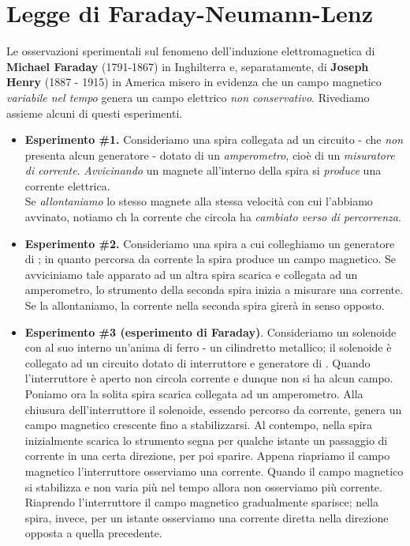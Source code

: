 \section{Legge di Faraday-Neumann-Lenz}
Le osservazioni sperimentali sul fenomeno dell'induzione elettromagnetica di \textbf{Michael Faraday} (1791-1867) in Inghilterra e, separatamente, di \textbf{Joseph Henry} (1887 - 1915) in America misero in evidenza che un campo magnetico \textit{variabile nel tempo} genera un campo elettrico \textit{non conservativo}. Rivediamo assieme alcuni di questi esperimenti.
\begin{itemize}
	\item \textbf{Esperimento \#1.} Consideriamo una spira collegata ad un circuito - che \textit{non} presenta alcun generatore - dotato di un \textit{amperometro}, cioè di un \textit{misuratore di corrente}. \textit{Avvicinando} un magnete all'interno della spira si \textit{produce} una corrente elettrica.\\
	Se \textit{allontaniamo} lo stesso magnete alla stessa velocità con cui l'abbiamo avvinato, notiamo ch la corrente che circola ha \textit{cambiato verso di percorrenza}.
	\item \textbf{Esperimento \#2.} Consideriamo una spira a cui colleghiamo un generatore di \fem; in quanto percorsa da corrente la spira produce un campo magnetico. Se avviciniamo tale apparato ad un altra spira scarica e collegata ad un amperometro, lo strumento della seconda spira inizia a misurare una corrente. Se la allontaniamo, la corrente nella seconda spira girerà in senso opposto.
	\item \textbf{Esperimento \#3 (esperimento di Faraday)}. Consideriamo un solenoide con al suo interno un'anima di ferro - un cilindretto metallico; il solenoide è collegato ad un circuito dotato di interruttore e generatore di \fem. Quando l'interruttore è aperto non circola corrente e dunque non si ha alcun campo.\\
	Poniamo ora la solita spira scarica collegata ad un amperometro. Alla chiusura dell'interruttore il solenoide, essendo percorso da corrente, genera un campo magnetico crescente fino a stabilizzarsi. Al contempo, nella spira inizialmente scarica lo strumento segna per qualche istante un passaggio di corrente in una certa direzione, per poi sparire. Appena riapriamo il campo magnetico l'interruttore osserviamo una corrente. Quando il campo magnetico si stabilizza e non varia più nel tempo allora non osserviamo più corrente.\\
	Riaprendo l'interruttore il campo magnetico gradualmente sparisce; nella spira, invece, per un istante osserviamo una corrente diretta nella direzione opposta a quella precedente.
\end{itemize}
